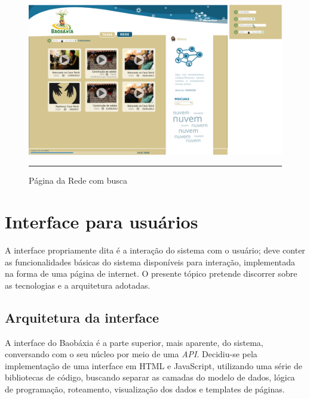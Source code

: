 \begin{figure}[htbp]
  \centering
  \includegraphics[width=\textwidth]{./Fig/layout-pgREDEbusca.pdf}
  \rule{35em}{0.5pt}
  \caption[Página da Rede com busca]{Página da Rede com busca}
  \label{fig:layout-pgREDEbusca}
\end{figure}

\section{Interface para usuários}
A interface propriamente dita é a interação do sistema com o usuário;
deve conter as funcionalidades básicas do sistema disponíveis para
interação, implementada na forma de uma página de internet. O presente
tópico pretende discorrer sobre as tecnologias e a arquitetura adotadas.

\subsection{Arquitetura da interface}
A interface do Baobáxia é a parte superior, mais aparente, do sistema,
conversando com o seu núcleo por meio de uma \emph{API}. Decidiu-se
pela implementação de uma interface em HTML e JavaScript, utilizando
uma série de bibliotecas de código, buscando separar as camadas do modelo
de dados, lógica de programação, roteamento, visualização dos dados e
templates de páginas.

